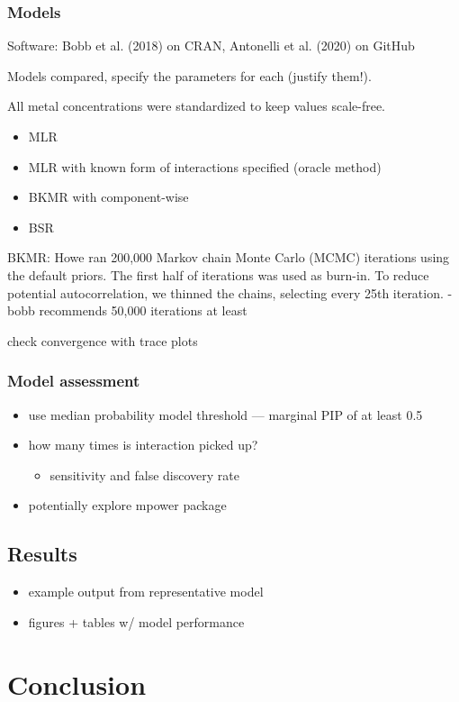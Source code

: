 \documentclass[12pt, twoside]{amherstthesis}
\providecommand{\tightlist}{%
  \setlength{\itemsep}{0pt}\setlength{\parskip}{0pt}}
\begin{document}
\hypertarget{models}{%
\subsection{Models}\label{models}}

Software: Bobb et al. (2018) on CRAN, Antonelli et al. (2020) on GitHub

Models compared, specify the parameters for each (justify them!).

All metal concentrations were standardized to keep values scale-free.
\begin{itemize}
\tightlist
\item
  MLR
\item
  MLR with known form of interactions specified (oracle method)
\item
  BKMR with component-wise
\item
  BSR
\end{itemize}
BKMR:
Howe ran 200,000 Markov chain Monte Carlo (MCMC) iterations using the default priors. The first half of iterations was used as burn-in. To reduce potential autocorrelation, we thinned the chains, selecting every 25th iteration.
- bobb recommends 50,000 iterations at least

check convergence with trace plots

\hypertarget{model-assessment}{%
\subsection{Model assessment}\label{model-assessment}}
\begin{itemize}
\tightlist
\item
  use median probability model threshold --- marginal PIP of at least 0.5
\item
  how many times is interaction picked up?
  \begin{itemize}
  \tightlist
  \item
    sensitivity and false discovery rate
  \end{itemize}
\item
  potentially explore mpower package
\end{itemize}
\hypertarget{results}{%
\section{Results}\label{results}}
\begin{itemize}
\tightlist
\item
  example output from representative model
\item
  figures + tables w/ model performance
\end{itemize}
\hypertarget{conclusion}{%
\chapter*{Conclusion}\label{conclusion}}
\end{document}
